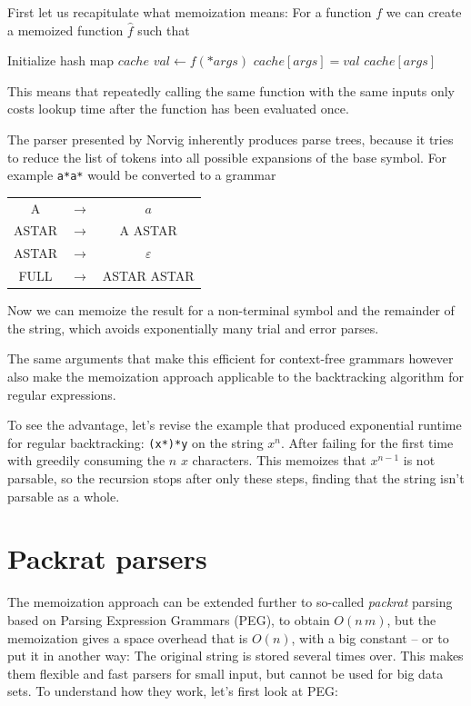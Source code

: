 \documentclass[11pt,a4paper,twoside,openright]{Thesis}
\theoremstyle{definition}
\begin{document}
First let us recapitulate what memoization means: For a function $f$ we can
create a memoized function $\hat f$ such that
\begin{algorithmic}
  \State Initialize hash map $cache$
  \State $val\leftarrow f(*args)$
  \State $cache[args] = val$
  \EndIf
  \State \Return $cache[args]$
  \EndFunction
\end{algorithmic}
This means that repeatedly calling the same function with  the same inputs
only costs lookup time after the function has been evaluated once.

The parser presented by Norvig inherently produces parse trees, because it
tries to reduce the list of tokens into all possible expansions of the base
symbol. For example \texttt{a*a*} would be converted to a grammar

\begin{center}
\begin{tabular}{ccc}
A& $\rightarrow$ & $a$\\
ASTAR & $\rightarrow$ & A ASTAR \\
ASTAR & $\rightarrow$ & $\varepsilon$ \\
FULL & $\rightarrow$ & ASTAR ASTAR \\
\end{tabular}
\end{center}

Now we can memoize the result for a non-terminal symbol and the remainder of
the string, which avoids exponentially many trial and error parses.

The same arguments that make this efficient for context-free grammars however
also make the memoization approach applicable to the backtracking algorithm
for regular expressions.

To see the advantage, let's revise the example that produced exponential runtime
for regular backtracking: \texttt{(x*)*y} on the string $x^n$. After failing
for the first time with greedily consuming the $n$ $x$ characters. This
memoizes that $x^{n-1}$ is not parsable, so the recursion stops after only
these steps, finding that the string isn't parsable as a whole.

\section{Packrat parsers}
The memoization approach can be extended further to so-called \emph{packrat}
parsing\cite{Mede12a} based on Parsing Expression Grammars (PEG), to obtain
$O(n\,m)$, but the memoization gives a space overhead that is
$O(n)$, with a big constant\cite{Ford02a} -- or to put it in another way: The
original string is stored several times over. This makes them flexible and fast
parsers for small input, but cannot be used for big data sets. To understand
how they work, let's first look at PEG:
\end{document}
